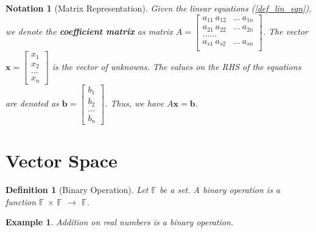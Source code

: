 \documentclass{article}
\newtheorem{definition}{Definition}[section] %
\newtheorem{notation}{Notation}[section] %
\newtheorem{example}{Example}[section]
\begin{document}
\begin{notation}[Matrix Representation]
    Given the linear equations (\ref{def_lin_eqn}), we denote the \textbf{coefficient matrix} as matrix
    $A = \begin{bmatrix}
        a_{11} \ a_{12} & ... \ a_{1n} \\
        a_{21} \ a_{22} & ... \ a_{2n} \\
        ...... \\
        a_{s1} \ a_{s2} & ... \ a_{sn} \\
    \end{bmatrix}$. The vector $\textbf{x}=\begin{bmatrix}x_1 \\ x_2 \\ ... \\ x_n \end{bmatrix}$ is the vector of unknowns. The values on the RHS of the equations are denoted as $\textbf{b}=\begin{bmatrix}b_1 \\ b_2 \\ ... \\ b_n \end{bmatrix}$. Thus, we have $A\textbf{x}=\textbf{b}$.
    
    
\end{notation}










\newpage
\section{Vector Space}
\begin{definition}[Binary Operation] Let $\mathbb{F}$ be a set. A binary operation is a function $\mathbb{F}$ $\times$ $\mathbb{F}$ $\rightarrow$ $\mathbb{F}$.
\end{definition}
\begin{example} Addition on real numbers is a binary operation.
\end{example}
\end{document}
